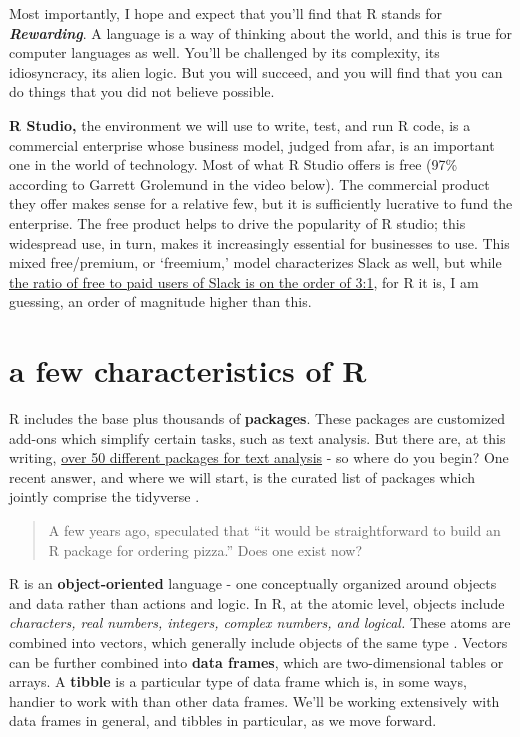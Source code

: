\documentclass[openany]{book}
\begin{document}
Most importantly, I hope and expect that you'll find that R stands for \textbf{\emph{Rewarding}}. A language is a way of thinking about the world, and this is true for computer languages as well. You'll be challenged by its complexity, its idiosyncracy, its alien logic. But you will succeed, and you will find that you can do things that you did not believe possible.

\textbf{R Studio,} the environment we will use to write, test, and run R code, is a commercial enterprise whose business model, judged from afar, is an important one in the world of technology. Most of what R Studio offers is free (97\% according to Garrett Grolemund in the video below). The commercial product they offer makes sense for a relative few, but it is sufficiently lucrative to fund the enterprise. The free product helps to drive the popularity of R studio; this widespread use, in turn, makes it increasingly essential for businesses to use. This mixed free/premium, or `freemium,' model characterizes Slack as well, but while \href{https://www.statista.com/statistics/652779/worldwide-slack-users-total-vs-paid/}{the ratio of free to paid users of Slack is on the order of 3:1}, for R it is, I am guessing, an order of magnitude higher than this.

\hypertarget{a-few-characteristics-of-r}{%
\section{a few characteristics of R}\label{a-few-characteristics-of-r}}

R includes the base plus thousands of \textbf{packages}. These packages are customized add-ons which simplify certain tasks, such as text analysis. But there are, at this writing, \href{https://cran.r-project.org/web/views/NaturalLanguageProcessing.html}{over 50 different packages for text analysis} - so where do you begin? One recent answer, and where we will start, is the curated list of packages which jointly comprise the tidyverse \citep{wickham2016r}.

\begin{quote}
A few years ago, \citet{peng2015r} speculated that ``it would be straightforward to build an R package for ordering pizza.'' Does one exist now?
\end{quote}

R is an \textbf{object-oriented} language - one conceptually organized around objects and data rather than actions and logic. In R, at the atomic level, objects include \emph{characters, real numbers, integers, complex numbers, and logical.} These atoms are combined into vectors, which generally include objects of the same type \citep[one kind of object, `lists,' is an exception to this;][]{peng2015r}. Vectors can be further combined into \textbf{data frames}, which are two-dimensional tables or arrays. A \textbf{tibble} is a particular type of data frame which is, in some ways, handier to work with than other data frames. We'll be working extensively with data frames in general, and tibbles in particular, as we move forward.
\end{document}
